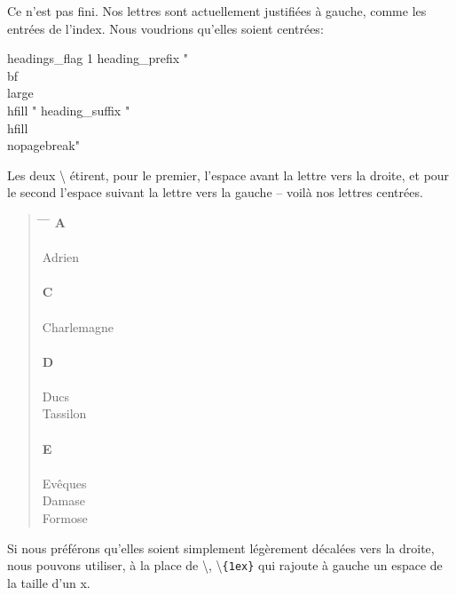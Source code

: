 Ce n'est pas fini. Nos lettres sont actuellement justifiées à gauche, comme les entrées de l'index. Nous voudrions qu'elles soient centrées: 

\begin{latexcode}
headings_flag 1
heading_prefix " {\\bf\\large\\hfill " 
heading_suffix " \\hfill}\\nopagebreak\n " 
\end{latexcode}

Les deux \textbackslash{} étirent, pour le premier, l'espace avant la lettre vers la droite, et pour le second l'espace suivant la lettre vers la gauche -- voilà nos lettres centrées.

\begin{quotation}
\begin{tabbing}
\hspace{0,5cm}  \= \hspace{1cm} \= \hspace{1,5cm} \= \kill
\>\> \large{\textbf{A}}\\
\\
Adrien\>\> \\
\\
\>\> \large{\textbf{C}}\\
\\
Charlemagne \>\> \\
\\
\>\> \large{\textbf{D}}\\
\\
Ducs \\
\> Tassilon\>\\
\\
\>\> \large{\textbf{E}}\\
\\
Evêques \\
\> Damase \>\\
\> Formose\>\\

\end{tabbing}
\end{quotation}


Si nous préférons qu'elles soient simplement légèrement décalées vers la droite, nous pouvons utiliser, à la place de \textbackslash{}, \textbackslash{}\verb|{1ex}| qui rajoute à gauche un espace de la taille d'un x. 


